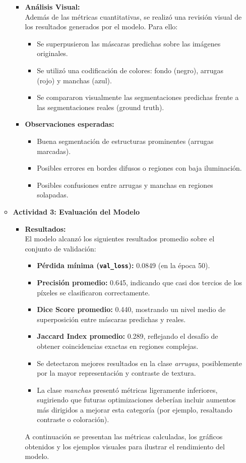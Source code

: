 \begin{enumerate}
\begin{itemize}
\begin{itemize}
\begin{itemize}
    \end{itemize}
  
    \item \textbf{Análisis Visual:}\\
    Además de las métricas cuantitativas, se realizó una revisión visual de los resultados generados por el modelo. Para ello:
    \begin{itemize}
      \item Se superpusieron las máscaras predichas sobre las imágenes originales.
      \item Se utilizó una codificación de colores: fondo (negro), arrugas (rojo) y manchas (azul).
      \item Se compararon visualmente las segmentaciones predichas frente a las segmentaciones reales (ground truth).
    \end{itemize}
  
    \item \textbf{Observaciones esperadas:}
    \begin{itemize}
      \item Buena segmentación de estructuras prominentes (arrugas marcadas).
      \item Posibles errores en bordes difusos o regiones con baja iluminación.
      \item Posibles confusiones entre arrugas y manchas en regiones solapadas.
    \end{itemize}
  \end{itemize}

  \item\textbf{Actividad 3: Evaluación del Modelo}
  \begin{itemize}
    \item \textbf{Resultados:}\\
El modelo alcanzó los siguientes resultados promedio sobre el conjunto de validación:
\begin{itemize}
  \item \textbf{Pérdida mínima (\texttt{val\_loss}):} 0.0849 (en la época 50).
  \item \textbf{Precisión promedio:} 0.645, indicando que casi dos tercios de los píxeles se clasificaron correctamente.
  \item \textbf{Dice Score promedio:} 0.440, mostrando un nivel medio de superposición entre máscaras predichas y reales.
  \item \textbf{Jaccard Index promedio:} 0.289, reflejando el desafío de obtener coincidencias exactas en regiones complejas.
  \item Se detectaron mejores resultados en la clase \emph{arrugas}, posiblemente por la mayor representación y contraste de textura.
  \item La clase \emph{manchas} presentó métricas ligeramente inferiores, sugiriendo que futuras optimizaciones deberían incluir aumentos más dirigidos a mejorar esta categoría (por ejemplo, resaltando contraste o coloración).
\end{itemize}
  A continuación se presentan las métricas calculadas, los gráficos obtenidos y los ejemplos visuales para ilustrar el rendimiento del modelo.


\end{itemize}
\end{itemize}
\end{enumerate}
